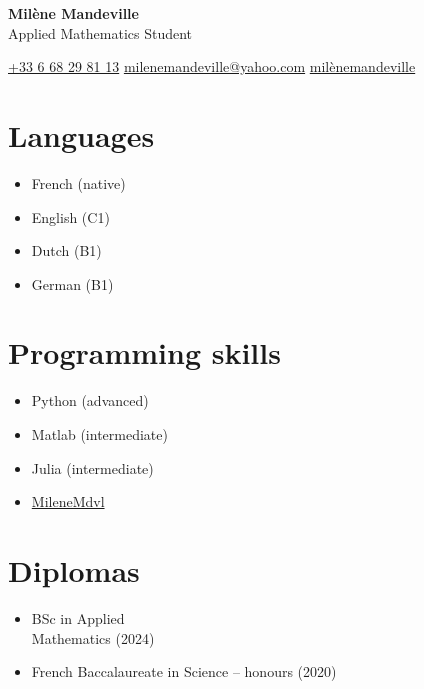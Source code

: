 \documentclass[10pt]{article}
\begin{document}
\pagestyle{empty}
\begin{center}
    {\textbf{\huge Milène Mandeville}}\\\Large{Applied Mathematics Student}\vspace{3mm}
\end{center}
\begin{center}
     \href{https://wa.me/33668298113}{+33 6 68 29 81 13} \hspace{1cm}
     \href{mailto:milenemandeville@yahoo.com}{milenemandeville@yahoo.com} \hspace{1cm}
     \href{https://www.linkedin.com/in/milène-mandeville}{milènemandeville}\vspace{3mm}
\end{center}
\begin{minipage}[t]{0.3\linewidth}
\section*{Languages}
\begin{itemize}
    \item French (native)
    \item English (C1)
    \item Dutch (B1)
    \item German (B1)
\end{itemize}
\end{minipage}\hfill
\begin{minipage}[t]{0.3\linewidth}
\section*{Programming skills}
\begin{itemize}
    \item Python (advanced)
    \item Matlab (intermediate)
    \item Julia (intermediate)
    \item[\faGithub] \href{https://github.com/MileneMdvl}{MileneMdvl}
\end{itemize}
\end{minipage}\hfill
\begin{minipage}[t]{0.3\linewidth}
\section*{Diplomas}
\begin{itemize}
    \item BSc in Applied \\ Mathematics (2024)
    \item French Baccalaureate in Science -- honours (2020)
\end{itemize}
\end{minipage}\hfill 
\end{document}
